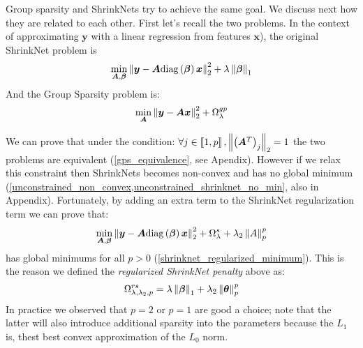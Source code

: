 Group sparsity and ShrinkNets try to achieve the same goal. We discuss next how
they are related to each other. First let's recall the two problems. In the context of approximating $\bm{y}$ with a linear regression from features $\bm{x}$), the
original ShrinkNet problem is 
%
\begin{equation}
  \min_{\bm{A}, \bm{\beta}} \left\lVert\bm{y} - \bm{A}\text{diag}\left(\bm{\beta}\right)\bm{x}\right\rVert_2^2 + \lambda \left\lVert\bm{\beta}\right\rVert_1
\end{equation}
%
And the Group Sparsity problem is:
%
\begin{equation}
  \min_{\bm{A}} \left\lVert\bm{y} - \bm{A}\bm{x}\right\rVert_2^2 + \Omega_\lambda^{gp}
\end{equation}
%

We can prove that under the condition: $\forall j\in \left\llbracket1, p\right\rrbracket,
\left\lVert\left(\bm{A}^T\right)_j\right\rVert_2 = 1$ the two problems are equivalent
(\cref{gps_equivalence}, see Apendix). However if we relax this constraint then ShrinkNets
becomes non-convex and has no global minimum
(\cref{unconstrained_non_convex,unconstrained_shrinknet_no_min}, also in Appendix). Fortunately,
by adding an extra term to the ShrinkNet regularization term we can prove that:
%
\begin{equation}
  \min_{\bm{A}, \bm{\beta}} \left\lVert\bm{y} - \bm{A}\text{diag}\left(\bm{\beta}\right)\bm{x}\right\rVert_2^2 + \Omega_\lambda^s + \lambda_2\left\lVert A\right\rVert_p^p
\end{equation}
%
has global minimums for all $p>0$ (\cref{shrinknet_regularized_minimum}).
This is the reason we defined the \textit{regularized ShrinkNet penalty} above
as:
%
\begin{equation}
  \Omega_{\lambda, \lambda_2, p}^{rs} = \lambda\left\lVert\bm{\beta}\right\rVert_1 + \lambda_2\left\lVert\bm\theta\right\rVert_p^p
\end{equation}
%
In practice we observed that $p=2$ or $p=1$ are good a choice; note that the latter
will also introduce additional sparsity into the parameters because the $L_1$ is, 
thest best convex approximation of the $L_0$ norm.


